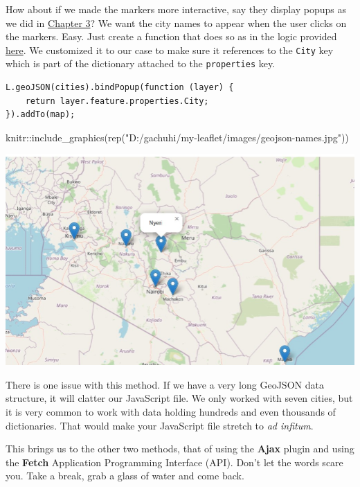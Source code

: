 \documentclass[
]{book}
\newenvironment{Shaded}{\begin{snugshade}}{\end{snugshade}}
\newcommand{\FunctionTok}[1]{\textcolor[rgb]{0.00,0.00,0.00}{#1}}
\newcommand{\NormalTok}[1]{#1}
\newcommand{\SpecialCharTok}[1]{\textcolor[rgb]{0.00,0.00,0.00}{#1}}
\newcommand{\StringTok}[1]{\textcolor[rgb]{0.31,0.60,0.02}{#1}}
\begin{document}
How about if we made the markers more interactive, say they display popups as we did in \protect\hyperlink{a-marker-with-a-popup}{Chapter 3}? We want the city names to appear when the user clicks on the markers. Easy. Just create a function that does so as in the logic provided \href{https://leafletjs.com/reference.html\#geojson}{here}. We customized it to our case to make sure it references to the \texttt{City} key which is part of the dictionary attached to the \texttt{properties} key.

\begin{verbatim}
L.geoJSON(cities).bindPopup(function (layer) {
    return layer.feature.properties.City;
}).addTo(map);
\end{verbatim}

\begin{Shaded}
\begin{Highlighting}[]
\NormalTok{knitr}\SpecialCharTok{::}\FunctionTok{include\_graphics}\NormalTok{(}\FunctionTok{rep}\NormalTok{(}\StringTok{"D:/gachuhi/my{-}leaflet/images/geojson{-}names.jpg"}\NormalTok{))}
\end{Highlighting}
\end{Shaded}

\includegraphics[width=14.01in]{../images/geojson-names}

There is one issue with this method. If we have a very long GeoJSON data structure, it will clatter our JavaScript file. We only worked with seven cities, but it is very common to work with data holding hundreds and even thousands of dictionaries. That would make your JavaScript file stretch to \emph{ad infitum}.

This brings us to the other two methods, that of using the \textbf{Ajax} plugin and using the \textbf{Fetch} Application Programming Interface (API). Don't let the words scare you. Take a break, grab a glass of water and come back.
\end{document}

